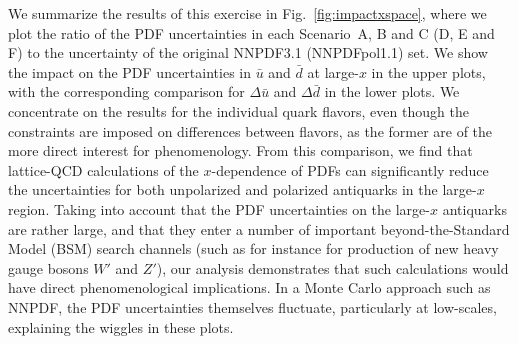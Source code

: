 We summarize the results of this exercise in Fig.~\ref{fig:impactxspace}, 
where we plot the ratio of the PDF uncertainties in each Scenario~A, B and C 
(D, E and F) to the uncertainty of the original
NNPDF3.1 (NNPDFpol1.1) set.
%
We show the impact on the PDF uncertainties
in $\bar{u}$ and $\bar{d}$ at large-$x$ in the upper
plots, with the corresponding comparison for $\Delta\bar{u}$
and $\Delta\bar{d}$ in the lower plots.
%
We concentrate on the results for the individual quark flavors, even though 
the constraints are imposed on differences between flavors, as the former are 
of the more direct interest for phenomenology. 
%
From this comparison, we find that lattice-QCD calculations of the 
$x$-dependence of PDFs can significantly reduce the uncertainties for both 
unpolarized and polarized antiquarks in the large-$x$ region.
%
Taking into account that the PDF uncertainties on the large-$x$
antiquarks are rather large, and that they
enter a number of important beyond-the-Standard Model (BSM) search channels
(such as for instance for production of new heavy gauge bosons $W'$ and $Z'$),
our analysis demonstrates that such calculations would have direct
phenomenological implications.
%
In a Monte Carlo approach such as NNPDF, the
PDF uncertainties themselves fluctuate, particularly at low-scales,
explaining the wiggles in these plots.

